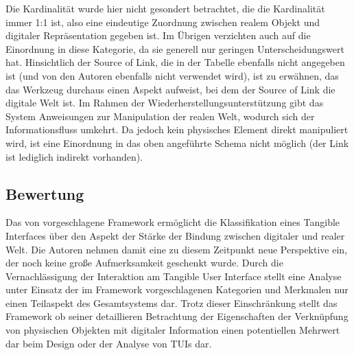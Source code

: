 Die Kardinalität wurde hier nicht gesondert betrachtet, die die Kardinalität immer 1:1 ist, also eine eindeutige Zuordnung zwischen realem Objekt und digitaler Repräsentation gegeben ist. Im Übrigen verzichten auch \citet{Koleva03} auf die Einordnung in diese Kategorie, da sie generell nur geringen Unterscheidungswert hat. Hinsichtlich der Source of Link, die in der Tabelle ebenfalls nicht angegeben ist (und von den Autoren ebenfalls nicht verwendet wird), ist zu erwähnen, das das Werkzeug durchaus einen Aspekt aufweist, bei dem der Source of Link die digitale Welt ist. Im Rahmen der Wiederherstellungsunterstützung gibt das System Anweisungen zur Manipulation der realen Welt, wodurch sich der Informationsfluss umkehrt. Da jedoch kein physisches Element direkt manipuliert wird, ist eine Einordnung in das oben angeführte Schema nicht möglich (der Link ist lediglich indirekt vorhanden).


\subsection{Bewertung} %
\label{sub:bewertung}

Das von \citep{Koleva03} vorgeschlagene Framework ermöglicht die Klassifikation eines Tangible Interfaces über den Aspekt der Stärke der Bindung zwischen digitaler und realer Welt. Die Autoren nehmen damit eine zu diesem Zeitpunkt neue Perspektive ein, der noch keine große Aufmerksamkeit geschenkt wurde. Durch die Vernachlässigung der Interaktion am Tangible User Interface stellt eine Analyse unter Einsatz der im Framework vorgeschlagenen Kategorien und Merkmalen nur einen Teilaspekt des Gesamtsystems dar. Trotz dieser Einschränkung stellt das Framework ob seiner detaillieren Betrachtung der Eigenschaften der Verknüpfung von physischen Objekten mit digitaler Information einen potentiellen Mehrwert dar beim Design oder der Analyse von \glspl{TUI} dar. 

